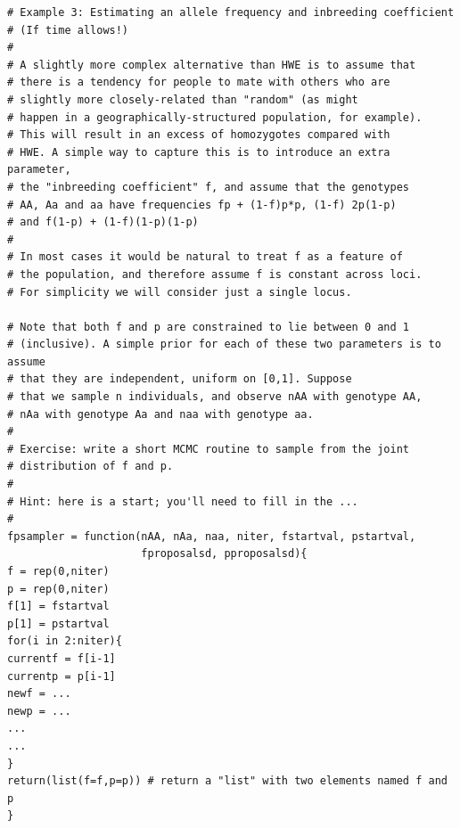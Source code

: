 \begin{verbatim}
# Example 3: Estimating an allele frequency and inbreeding coefficient
# (If time allows!)
#
# A slightly more complex alternative than HWE is to assume that
# there is a tendency for people to mate with others who are 
# slightly more closely-related than "random" (as might
# happen in a geographically-structured population, for example).
# This will result in an excess of homozygotes compared with
# HWE. A simple way to capture this is to introduce an extra parameter,
# the "inbreeding coefficient" f, and assume that the genotypes
# AA, Aa and aa have frequencies fp + (1-f)p*p, (1-f) 2p(1-p)
# and f(1-p) + (1-f)(1-p)(1-p)
#
# In most cases it would be natural to treat f as a feature of
# the population, and therefore assume f is constant across loci.
# For simplicity we will consider just a single locus.

# Note that both f and p are constrained to lie between 0 and 1
# (inclusive). A simple prior for each of these two parameters is to assume
# that they are independent, uniform on [0,1]. Suppose
# that we sample n individuals, and observe nAA with genotype AA,
# nAa with genotype Aa and naa with genotype aa. 
#
# Exercise: write a short MCMC routine to sample from the joint
# distribution of f and p.
# 
# Hint: here is a start; you'll need to fill in the ...
# 
fpsampler = function(nAA, nAa, naa, niter, fstartval, pstartval, 
                     fproposalsd, pproposalsd){
f = rep(0,niter)
p = rep(0,niter)
f[1] = fstartval
p[1] = pstartval
for(i in 2:niter){
currentf = f[i-1]
currentp = p[i-1]
newf = ...
newp = ...
...
...
}
return(list(f=f,p=p)) # return a "list" with two elements named f and p
}
\end{verbatim}





